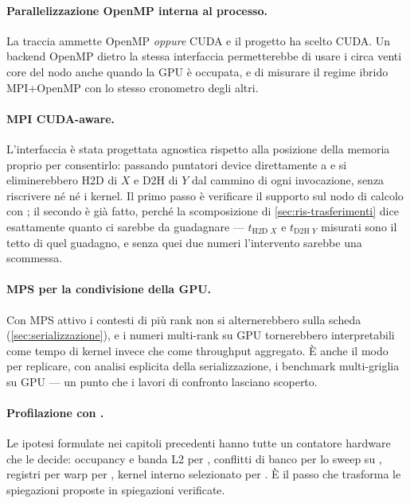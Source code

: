 \paragraph{Parallelizzazione OpenMP interna al processo.} La traccia ammette
OpenMP \emph{oppure} CUDA e il progetto ha scelto CUDA. Un backend OpenMP dietro
la stessa interfaccia  permetterebbe di usare i circa venti
core del nodo anche quando la GPU \`e occupata, e di misurare il regime ibrido
MPI+OpenMP con lo stesso cronometro degli altri.

\paragraph{MPI CUDA-aware.} L'interfaccia  \`e stata progettata
agnostica rispetto alla posizione della memoria proprio per consentirlo:
passando puntatori device direttamente a  e 
si eliminerebbero H2D di $X$ e D2H di $Y$ dal cammino di ogni invocazione, senza
riscrivere n\'e  n\'e i kernel. Il primo passo \`e verificare il
supporto sul nodo di calcolo con ; il secondo \`e
gi\`a fatto, perch\'e la scomposizione di \cref{sec:ris-trasferimenti} dice
esattamente quanto ci sarebbe da guadagnare --- $t_{\text{H2D }X}$ e
$t_{\text{D2H }Y}$ misurati sono il tetto di quel guadagno, e senza quei due
numeri l'intervento sarebbe una scommessa.

\paragraph{MPS per la condivisione della GPU.} Con MPS attivo i contesti di pi\`u
rank non si alternerebbero sulla scheda (\cref{sec:serializzazione}), e i
numeri multi-rank su GPU tornerebbero interpretabili come tempo di kernel invece
che come throughput aggregato. \`E anche il modo per replicare, con analisi
esplicita della serializzazione, i benchmark multi-griglia su GPU --- un punto
che i lavori di confronto lasciano scoperto.

\paragraph{Profilazione con .} Le ipotesi formulate nei capitoli
precedenti hanno tutte un contatore hardware che le decide: occupancy e banda L2
per , conflitti di banco per lo sweep su
, registri per warp per , kernel
interno selezionato per . \`E il passo che trasforma le
spiegazioni proposte in spiegazioni verificate.
